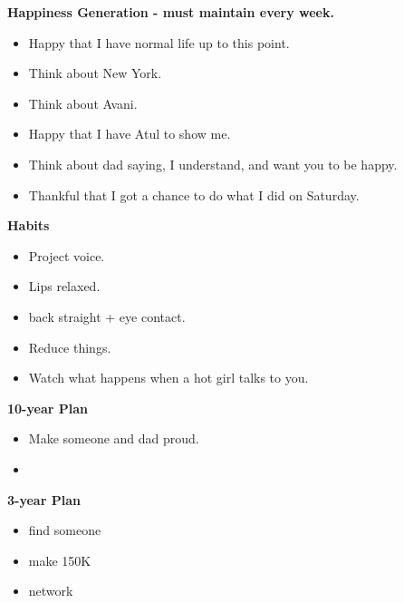 \documentclass[11pt]{article}
\begin{document}
\newpage 


\textbf{Happiness Generation - must maintain every week.}
\begin{itemize}
  \tiny \item \tiny Happy that I have normal life up to this point.
  \item \tiny Think about New York. 
  \item \tiny Think about Avani. 
  \item \tiny Happy that I have Atul to show me.
  \item \tiny Think about dad saying, I understand, and want you to be happy. 
  \item \tiny Thankful that I got a chance to do what I did on Saturday. 
\end{itemize} 

\textbf{Habits}
\begin{itemize}
\item \tiny Project voice. 
\item \tiny Lips relaxed.
  \tiny \item \tiny back straight + eye contact.
\item \tiny Reduce things.
\item \tiny Watch what happens when a hot girl talks to you.
\end{itemize} 

\newpage
\textbf{10-year Plan}
\begin{itemize}
\item \small Make someone and dad proud.
\item \small 
\end{itemize}

\textbf{3-year Plan} 
\begin{itemize} 
  \small \item \small find someone
\item \small make 150K
\item \small network
\end{itemize} 
\end{document}
